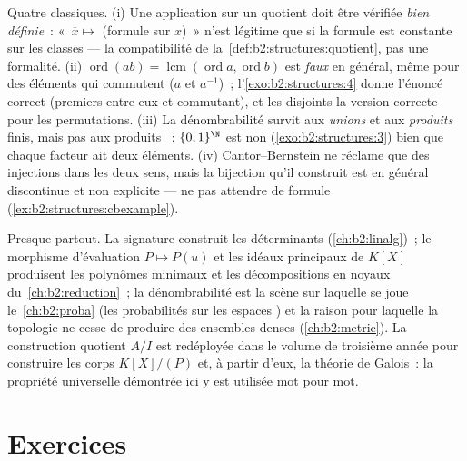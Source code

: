 \begin{remark}\label{rem:b2:structures:pitfalls}
Quatre classiques. (i) Une application sur un quotient doit être
vérifiée \emph{bien définie}~: «~$\overline x \mapsto$ (formule sur
$x$)~» n'est légitime que si la formule est constante sur les
classes --- la compatibilité de la~\cref{def:b2:structures:quotient},
pas une formalité. (ii) $\operatorname{ord}(ab) =
\operatorname{lcm}(\operatorname{ord}a, \operatorname{ord}b)$
est \emph{faux} en général, même pour des éléments qui commutent
($a$ et $a^{-1}$)~; l'\cref{exo:b2:structures:4} donne l'énoncé
correct (premiers entre eux et commutant), et les  disjoints
la version correcte pour les permutations. (iii) La dénombrabilité
survit aux \emph{unions}  et aux \emph{produits} finis,
mais pas aux produits ~: $\{0,1\}^{\N}$ est non
 (\cref{exo:b2:structures:3}) bien que chaque facteur ait
deux éléments. (iv) Cantor--Bernstein ne réclame que des injections
dans les deux sens, mais la bijection qu'il construit est en général
discontinue et non explicite --- ne pas attendre de formule
(\cref{ex:b2:structures:cbexample}).
\end{remark}

\begin{remark}
Presque partout. La signature construit les déterminants
(\cref{ch:b2:linalg})~; le morphisme d'évaluation $P \mapsto P(u)$
et les idéaux principaux de $K[X]$ produisent les polynômes minimaux
et les décompositions en noyaux du~\cref{ch:b2:reduction}~; la
dénombrabilité est la scène sur laquelle se joue le~\cref{ch:b2:proba}
(les probabilités sur les espaces ) et la raison pour
laquelle la topologie ne cesse de produire des ensembles denses
 (\cref{ch:b2:metric}). La construction quotient $A/I$
est redéployée dans le volume de troisième année pour construire les
corps $K[X]/(P)$ et, à partir d'eux, la théorie de Galois~: la
propriété universelle démontrée ici y est utilisée mot pour mot.
\end{remark}

\section{Exercices}

